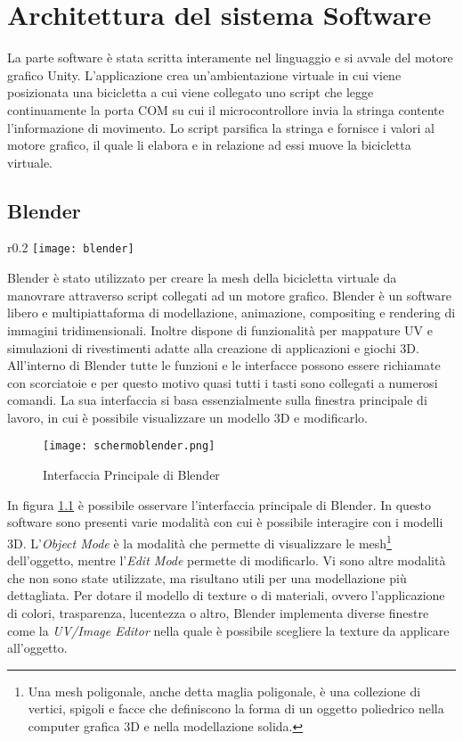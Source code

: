 \chapter{Architettura del sistema Software}
\label{software}
\thispagestyle{empty}

\label{software}
La parte software è stata scritta interamente nel linguaggio \Csharp\: e si avvale del motore grafico Unity. L'applicazione crea un'ambientazione virtuale in cui viene posizionata una bicicletta a cui viene collegato uno script che legge continuamente la porta COM su cui il microcontrollore invia la stringa contente l'informazione di movimento. Lo script parsifica la stringa e fornisce i valori al motore grafico, il quale li elabora e in relazione ad essi muove la bicicletta virtuale.
\section{Blender}
\begin{wrapfigure}{r}{0.2\textwidth} %
    \centering
    \vspace{-1.0cm}
    \texttt{[image: blender]}
\end{wrapfigure}
Blender è stato utilizzato per creare la mesh della bicicletta virtuale da manovrare attraverso script collegati ad un motore grafico.
Blender è un software libero e multipiattaforma di modellazione, animazione, compositing e rendering di immagini tridimensionali. Inoltre dispone di funzionalità per mappature UV e simulazioni di rivestimenti adatte alla creazione di applicazioni e giochi 3D. All'interno di Blender tutte le funzioni e le interfacce possono essere richiamate con scorciatoie e per questo motivo quasi tutti i tasti sono collegati a numerosi comandi. La sua interfaccia si basa essenzialmente sulla finestra principale di lavoro, in cui è possibile visualizzare un modello 3D e modificarlo. \\
\begin{figure}[hbt]
\centering
  \texttt{[image: schermoblender.png]}
  \caption{Interfaccia Principale di Blender}
  \label{fig:schermoblender}
\end{figure}

\noindent In figura \ref{fig:schermoblender} è possibile osservare l'interfaccia principale di Blender. In questo software sono presenti varie modalità con cui è possibile interagire con i modelli 3D. L'\textit{Object Mode} è la modalità che permette di visualizzare le mesh\footnote{Una mesh poligonale, anche detta maglia poligonale, è una collezione di vertici, spigoli e facce che definiscono la forma di un oggetto poliedrico nella computer grafica 3D e nella modellazione solida.} dell'oggetto, mentre l'\textit{Edit Mode} permette di modificarlo. Vi sono altre modalità che non sono state utilizzate, ma risultano utili per una modellazione più dettagliata. Per dotare il modello di texture o di materiali, ovvero l'applicazione di colori, trasparenza, lucentezza o altro, Blender implementa diverse finestre come la \textit{UV/Image Editor} nella quale è possibile scegliere la texture da applicare all'oggetto. \newpage

